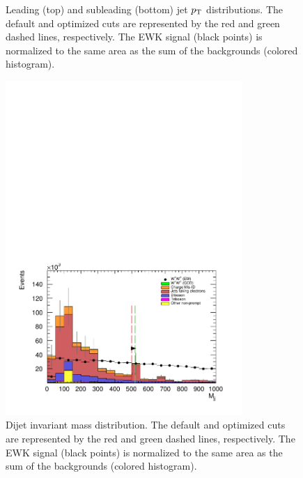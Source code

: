 \begin{figure}[htp]
  \caption{Leading (top) and subleading (bottom) jet $p_{\mathrm{T}}$ distributions.  The default and optimized cuts are represented by the red and green dashed lines, respectively.  The \ssww EWK signal (black points) is normalized to the same area as the sum of the backgrounds (colored histogram).}
  \label{fig:optimized_jetpt}
\end{figure}

\begin{figure}[htp]
  \centering
  \includegraphics[width=0.8\textwidth]{figs/ssww_upgrade/optimization_plots/mjj}
  \caption{Dijet invariant mass distribution.  The default and optimized cuts are represented by the red and green dashed lines, respectively.  The \ssww EWK signal (black points) is normalized to the same area as the sum of the backgrounds (colored histogram). }
  \label{fig:optimized_mjj}
\end{figure}

